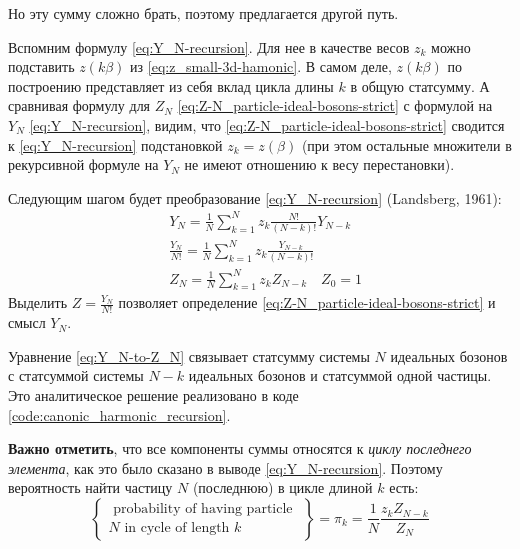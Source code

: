 Но эту сумму сложно брать, поэтому предлагается другой путь.

Вспомним формулу \eqref{eq:Y_N-recursion}.
Для нее в качестве весов $z_k$ можно подставить $z(k\beta)$ из \eqref{eq:z_small-3d-hamonic}.
В самом деле, $z(k\beta)$ по построению представляет из себя вклад цикла длины $k$ в общую статсумму.
А сравнивая формулу для $Z_N$ \eqref{eq:Z-N_particle-ideal-bosons-strict} с формулой на $Y_N$ \eqref{eq:Y_N-recursion}, видим, что \eqref{eq:Z-N_particle-ideal-bosons-strict} сводится к \eqref{eq:Y_N-recursion} подстановкой $z_k=z(\beta)$ (при этом остальные множители в рекурсивной формуле на $Y_N$ не имеют отношению к весу перестановки).

Следующим шагом будет преобразование \eqref{eq:Y_N-recursion} (Landsberg, 1961):
\begin{align}
    \label{eq:Y_N-to-Z_N}
    \nonumber
    & Y_{N}=\frac{1}{N} \sum_{k=1}^{N} z_{k} \frac{N !}{(N-k) !} Y_{N-k} \\
    \nonumber
    & \boxed{\frac{Y_{N}}{N !}}=\frac{1}{N} \sum_{k=1}^{N} z_{k} \boxed{\frac{Y_{N-k}}{(N-k) !}} \\
    & Z_{N}=\frac{1}{N} \sum_{k=1}^{N} z_{k} Z_{N-k} \quad Z_0 = 1
\end{align}
Выделить $Z = \frac{Y_N}{N!}$ позволяет определение \eqref{eq:Z-N_particle-ideal-bosons-strict} и смысл $Y_N$.

Уравнение \eqref{eq:Y_N-to-Z_N} связывает статсумму системы $N$ идеальных бозонов с статсуммой системы $N-k$ идеальных бозонов и статсуммой одной частицы.
Это аналитическое решение реализовано в коде \ref{code:canonic_harmonic_recursion}.


\textbf{Важно отметить}, что все компоненты суммы относятся к \textit{циклу последнего элемента}, как это было сказано в выводе \eqref{eq:Y_N-recursion}.
Поэтому вероятность найти частицу $N$ (последнюю) в цикле длиной $k$ есть:
\begin{equation*}
    \left\{\begin{array}{c}\text { probability of having particle } \\ N \text { in cycle of length } k\end{array}\right\}=\pi_{k}=\frac{1}{N} \frac{z_{k} Z_{N-k}}{Z_{N}}
\end{equation*}

